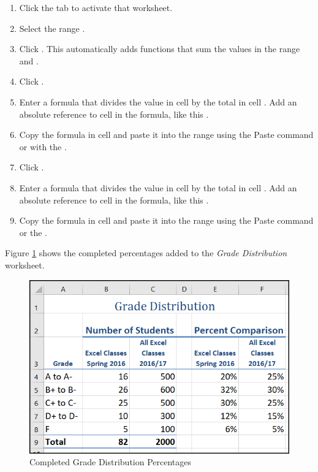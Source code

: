 \begin{enumerate}
	\item Click the  tab to activate that worksheet.
	\item Select the range .
	\item Click . This automatically adds  functions that sum the values in the range  and .
	\item Click .
	\item Enter a formula that divides the value in cell  by the total in cell . Add an absolute reference to cell  in the formula, like this .
	\item Copy the formula in cell  and paste it into the range  using the Paste command or with the .
	\item Click .
	\item Enter a formula that divides the value in cell  by the total in cell . Add an absolute reference to cell  in the formula, like this .
	\item Copy the formula in cell  and paste it into the range  using the Paste command or the .
\end{enumerate}

Figure \ref{04:fig17} shows the completed percentages added to the \textit{Grade Distribution} worksheet.

\begin{figure}[H]
	\centering
	\includegraphics[width=\maxwidth{.95\linewidth}]{gfx/ch04_fig17}
	\caption{Completed Grade Distribution Percentages}
	\label{04:fig17}
\end{figure}

